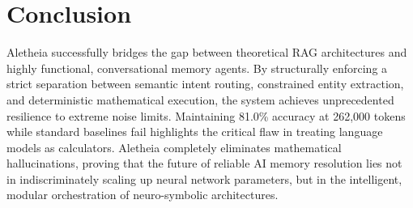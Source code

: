 \documentclass[journal,10pt]{IEEEtran}
\begin{document}
\section{Conclusion}
Aletheia successfully bridges the gap between theoretical RAG architectures and highly functional, conversational memory agents. By structurally enforcing a strict separation between semantic intent routing, constrained entity extraction, and deterministic mathematical execution, the system achieves unprecedented resilience to extreme noise limits. Maintaining 81.0\% accuracy at 262,000 tokens while standard baselines fail highlights the critical flaw in treating language models as calculators. Aletheia completely eliminates mathematical hallucinations, proving that the future of reliable AI memory resolution lies not in indiscriminately scaling up neural network parameters, but in the intelligent, modular orchestration of neuro-symbolic architectures.
\end{document}
